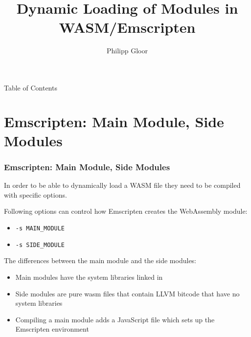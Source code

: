 \documentclass[10pt, a4paper]{beamer} %
\title %
{Dynamic Loading of Modules in WASM/Emscripten}
\author %
{Philipp Gloor}
\date{}
\begin{document}
\begin{frame}
\titlepage
\end{frame}

{
  \setlength{\parskip}{0ex}
\begin{frame}{Table of Contents}
    \tableofcontents
  \end{frame}
}
\section{Emscripten: Main Module, Side Modules}
\begin{frame}[c, allowframebreaks]\frametitle{Emscripten: Main Module, Side Modules}
  In order to be able to dynamically load a WASM file they need to be compiled with 
  specific options.
  
  Following options can control how Emscripten creates the WebAssembly module:
  \begin{itemize}
    \item \texttt{-s MAIN\_MODULE}
    \item \texttt{-s SIDE\_MODULE}
  \end{itemize}

  The differences between the main module and the side modules:
\framebreak
  \begin{itemize}
    \item Main modules have the system libraries linked in
    \item Side modules are pure wasm files that contain LLVM bitcode that have no system libraries
    \item Compiling a main module adds a JavaScript file which sets up the Emscripten environment
  \end{itemize}
\end{frame}
\end{document}
